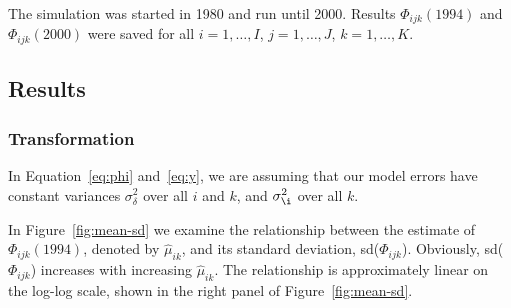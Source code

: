 \documentclass[11pt, fleqn]{article}
\begin{document}
The simulation was started in 1980 and run until 2000. Results
$\Phi_{ijk}(1994)$ and $\Phi_{ijk}(2000)$ were saved for all $i=1,\dots,I$,
$j=1,\dots,J$, $k=1,\dots,K$.


\subsection{Results}
%
\subsubsection{Transformation}
%
In Equation~\ref{eq:phi} and~\ref{eq:y}, we are assuming that our model errors
have constant variances $\sigma_{\delta}^2$ over all $i$ and $k$, and
$\sigma_{\i}^2$ over all $k$.

In Figure~\ref{fig:mean-sd} we examine the relationship between the estimate
of $\Phi_{ijk}(1994)$, denoted by $\hat{\mu}_{ik}$, and its standard
deviation, sd($\Phi_{ijk}$). Obviously, sd($\Phi_{ijk}$) increases with
increasing $\hat{\mu}_{ik}$. The relationship is approximately linear on the
log-log scale, shown in the right panel of Figure~\ref{fig:mean-sd}.
\end{document}
